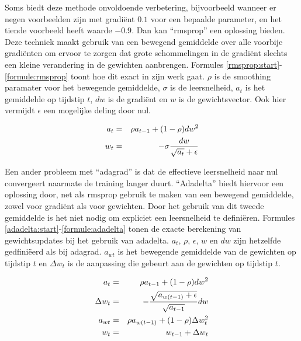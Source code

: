 Soms biedt deze methode onvoldoende verbetering, bijvoorbeeld wanneer er negen voorbeelden zijn met gradi\"ent $0.1$ voor een bepaalde parameter, en het tiende voorbeeld heeft waarde $-0.9$. Dan kan ``rmsprop''\cite{RMSprop} een oplossing bieden. Deze techniek maakt gebruik van een bewegend gemiddelde over alle voorbije gradi\"enten om ervoor te zorgen dat grote schommelingen in de gradi\"ent slechts een kleine verandering in de gewichten aanbrengen. Formules \eqref{rmsprop:start}-\eqref{formule:rmsprop} toont hoe dit exact in zijn werk gaat. $\rho$ is de smoothing paramater voor het bewegende gemiddelde, $\sigma$ is de leersnelheid, $a_t$ is het gemiddelde op tijdstip $t$, $dw$ is de gradi\"ent en $w$ is de gewichtsvector. Ook hier vermijdt $\epsilon$ een mogelijke deling door nul.

\begin{eqnarray}
\vspace{-3mm}
    \label{rmsprop:start}
    a_t & = & \rho  a_{t-1} + (1 - \rho)dw^2 \\
    w_t & = &  - \sigma \frac{dw}{\sqrt{a_t} + \epsilon}
    \label{formule:rmsprop}
    \vspace{-3mm}
\end{eqnarray}

Een ander probleem met ``adagrad'' is dat de effectieve leersnelheid naar nul convergeert naarmate de training langer duurt. ``Adadelta''\cite{Zeiler2012} biedt hiervoor een oplossing door, net als rmsprop gebruik te maken van een bewegend gemiddelde, zowel voor gradi\"ent als voor gewichten. Door het gebruik van dit tweede gemiddelde is het niet nodig om expliciet een leersnelheid te defini\"eren. Formules \eqref{adadelta:start}-\eqref{formule:adadelta} tonen de exacte berekening van gewichtsupdates bij het gebruik van adadelta. $a_t$, $\rho$, $\epsilon$, $w$ en $dw$ zijn hetzelfde gedfini\"eerd als bij adagrad. $a_{wt}$ is het bewegende gemiddelde van de gewichten op tijdstip $t$ en $\Delta w_t$ is de aanpassing die gebeurt aan de gewichten op tijdstip $t$.

\begin{eqnarray}
\vspace{-3mm}
    \label{adadelta:start}
    a_t & = & \rho  a_{t-1} + (1 - \rho)dw^2 \\
    \Delta w_t & = & - \frac{\sqrt{a_{w(t-1)} + \epsilon}}{\sqrt{a_{t-1}}}dw \\
    a_{wt} & = & \rho  a_{w(t-1)} + (1 - \rho)\Delta w_t^2 \\
    w_t & = & w_{t-1} + \Delta w_t
    \label{formule:adadelta}
    \vspace{-3mm}
\end{eqnarray}


